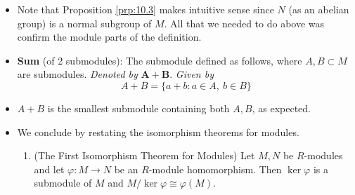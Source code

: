 \documentclass[../notes.tex]{subfiles}
\begin{document}
\begin{itemize}
\begin{proposition}
\begin{proof}
            \begin{align*}
                (ab)(x+N) &= abx+N\\
                &= a(bx+N)\\
                &= a(b(x+N))
            \end{align*}
            as desired.\par
            This concludes the proof of the first claim.\par\smallskip
            To prove that $\pi$ is a module homomorphism, it will suffice to show that it is a group homomorphism and commutes with scalar multiplication. Treating $M,M/N$ purely as groups, we may recall from group theory that $\pi$ is a group homomorphism. With respect to the other condition, we have for all $a\in R$ and $m\in M$ that
            \begin{align*}
                \pi(am) &= am+N\\
                &= a(m+N)\\
                &= a\pi(m)
            \end{align*}
            as desired.\par\smallskip
            The fact that $\ker\pi=N$ follows from group theory.
        \end{proof}
    \end{proposition}
    \item Note that Proposition \ref{prp:10.3} makes intuitive sense since $N$ (as an abelian group) is a normal subgroup of $M$. All that we needed to do above was confirm the module parts of the definition.
    \item \textbf{Sum} (of 2 submodules): The submodule defined as follows, where $A,B\subset M$ are submodules. \emph{Denoted by} $\bm{A+B}$. \emph{Given by}
    \begin{equation*}
        A+B = \{a+b:a\in A,\ b\in B\}
    \end{equation*}
    \item $A+B$ is the smallest submodule containing both $A,B$, as expected.
    \item We conclude by restating the isomorphism theorems for modules.
    \begin{theorem}\label{trm:10.4}\leavevmode
        \begin{enumerate}[ref={\thetheorem(\arabic*)}]
            \item \label{trm:10.4a}(The First Isomorphism Theorem for Modules) Let $M,N$ be $R$-modules and let $\varphi:M\to N$ be an $R$-module homomorphism. Then $\ker\varphi$ is a submodule of $M$ and $M/\ker\varphi\cong\varphi(M)$.

\end{enumerate}
\end{theorem}
\end{itemize}
\end{document}
